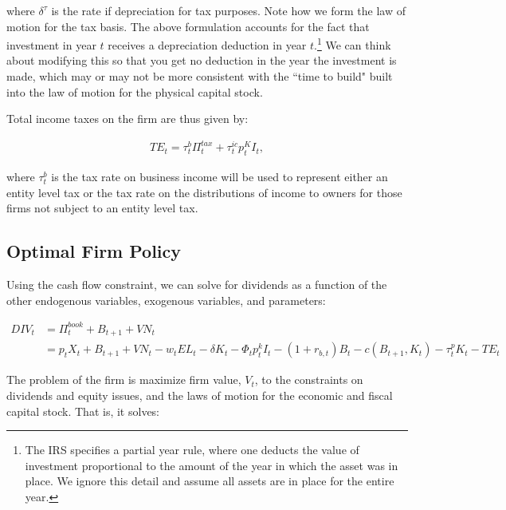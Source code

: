 \noindent\noindent where $\delta^{\tau}$ is the rate if depreciation for tax purposes.  Note how we form the law of motion for the tax basis.  The above formulation accounts for the fact that investment in year $t$ receives a depreciation deduction in year $t$.\footnote{The IRS specifies a partial year rule, where one deducts the value of investment proportional to the amount of the year in which the asset was in place.  We ignore this detail and assume all assets are in place for the entire year.}  We can think about modifying this so that you get no deduction in the year the investment is made, which may or may not be more consistent with the ``time to build" built into the law of motion for the physical capital stock.


Total income taxes on the firm are thus given by:

\begin{equation}
\label{eqn:corp_tax}
\begin{split}
TE_{t}= \tau^{b}_{t}\Pi^{tax}_{t} +\tau^{ic}_{t}p^{K}_{t}I_{t},
\end{split}
\end{equation}

\noindent\noindent  where $\tau^{b}_{t}$ is the tax rate on business income will be used to represent either an entity level tax or the tax rate on the distributions of income to owners for those firms not subject to an entity level tax.  

\subsection{Optimal Firm Policy}

Using the cash flow constraint, we can solve for dividends as a function of the other endogenous variables, exogenous variables, and parameters:

\begin{equation}
\label{eqn:div}
\begin{split}
DIV_{t}&=\Pi^{book}_{t} + B_{t+1} + VN_{t}\\
 & = p_{t}X_{t}+ B_{t+1} + VN_{t}-w_{t}EL_{t}-\delta K_{t} -\Phi_{t}p^{k}_{t}I_{t}-(1+r_{b,t})B_{t} - c(B_{t+1},K_{t})-\tau^{p}_{t}K_{t}-TE_{t}
\end{split}
\end{equation}

The problem of the firm is maximize firm value, $V_{t}$, to the constraints on dividends and equity issues, and the laws of motion for the economic and fiscal capital stock.  That is, it solves:

